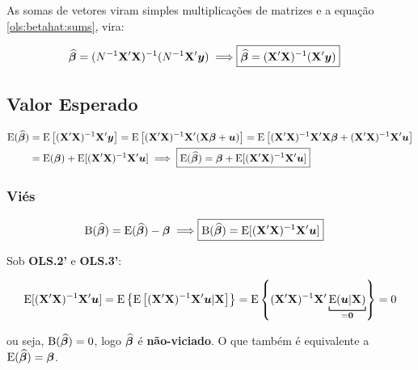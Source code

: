 \documentclass[11pt, oneside, a4paper, article]{article}
\numberwithin{equation}{section}
\begin{document}
As somas de vetores viram simples multiplicações de matrizes e a equação \eqref{ols:betahat:sums}, vira:

\vspace{-1 em}
\begin{align} 
\label{ols:betahat:mat}
\widehat{\betavec} = (N^{-1} \Xmat' \Xmat)^{-1} (N^{-1} \Xmat'\yvec)
\implies
\Aboxed{ \widehat{\mbs{\beta}} = (\Xmat'\Xmat)^{-1}(\Xmat'\yvec)}
\end{align}

\subsection{Valor Esperado} 

\vspace{-2 em}
\begin{align*} 
\text{E} ( \widehat{\boldsymbol{\beta}} ) 
&= \text{E} \left[ (\mathbf{X}'\mathbf{X})^{-1}\mathbf{X}'\boldsymbol{y} \right]
= \text{E} \left[ (\mathbf{X}'\mathbf{X})^{-1}\mathbf{X}'(\mathbf{X} \boldsymbol{\beta} + \boldsymbol{u}) \right]
= \text{E} \left[ (\mathbf{X}'\mathbf{X})^{-1}\mathbf{X}'\mathbf{X} \boldsymbol{\beta} + (\mathbf{X}'\mathbf{X})^{-1}\mathbf{X}'\boldsymbol{u} \right]
\\
&= \text{E} (\boldsymbol{\beta}) + \text{E}[(\mathbf{X}'\mathbf{X})^{-1}\mathbf{X}'\boldsymbol{u} ]
\implies
\boxed{
\text{E} ( \widehat{\boldsymbol{\beta}} ) 
= \boldsymbol{\beta} + \text{E}[(\mathbf{X}'\mathbf{X})^{-1}\mathbf{X}'\boldsymbol{u} ] }
\end{align*}

\subsubsection{Viés} 

\vspace{-2 em}
\begin{align*} 
\B( \widehat{\mbs{\beta}} ) = \E ( \widehat{\mbs{\beta}} ) - \mbs{\beta}
\implies
\Aboxed{ \B( \widehat{\mbs{\beta}} ) = \E[ (\Xmat'\Xmat)^{-1}\Xmat'\mbs{u} ] }
\end{align*}

\begin{remark}
Sob \textbf{OLS.2'} e \textbf{OLS.3'}:

\vspace{-2 em}
\begin{align*}
\E[(\Xmat'\Xmat)^{-1}\Xmat'\mbs{u} ]
= \E \left\{ \E\left[ (\Xmat'\Xmat)^{-1}\Xmat'\mbs{u} | \Xmat \right]  \right\}  
= \E \left\{  (\Xmat'\Xmat)^{-1}\Xmat'
\underbracket[.75pt]{\E( \mbs{u} | \Xmat )}_{= \mbs{0}}
\right\} = 0
\end{align*}

\noindent
ou seja, 
$\text{B}( \widehat{\boldsymbol{\beta}} ) = 0$, logo $\widehat{\boldsymbol{\beta}}$ é \textbf{não-viciado}.
O que também é equivalente a  $\text{E}( \widehat{\boldsymbol{\beta}} ) = \boldsymbol{\beta}$.
\end{remark}
\end{document}
